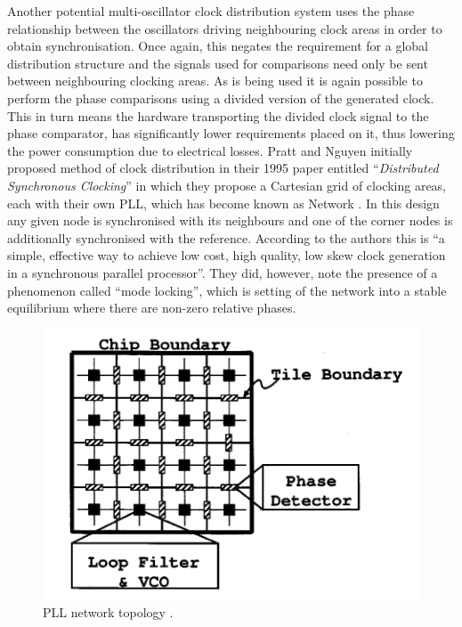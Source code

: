 Another potential multi-oscillator clock distribution system uses the phase relationship between the oscillators driving neighbouring clock areas in order to obtain synchronisation. Once again, this negates the requirement for a global distribution structure and the signals used for comparisons need only be sent between neighbouring clocking areas. As  is being used it is again possible to perform the phase comparisons using a divided version of the generated clock. This in turn means the hardware transporting the divided clock signal to the phase comparator, has significantly lower requirements placed on it, thus lowering the power consumption due to electrical losses. Pratt and Nguyen initially proposed method of clock distribution in their 1995 paper entitled ``\textit{Distributed Synchronous Clocking}'' in which they propose a Cartesian grid of clocking areas, each with their own \ac{PLL}, which has become known as  Network \cite{pratt1995distributed}. In this design any given node is synchronised with its neighbours and one of the corner nodes is additionally synchronised with the reference. According to the authors this is ``a simple, effective way to achieve low cost, high quality, low skew clock generation in a synchronous parallel processor''. They did, however, note the presence of a phenomenon called ``mode locking'', which is setting of the network into a stable equilibrium where there are non-zero relative phases.

\begin{figure}[h]
	\centering
	\includegraphics[scale=0.7]{../gutnik2000active}
	\caption[PLL network topology ]{PLL network topology \cite{gutnik2000active}.}
	\label{fig:gutnik2000active}
\end{figure}

